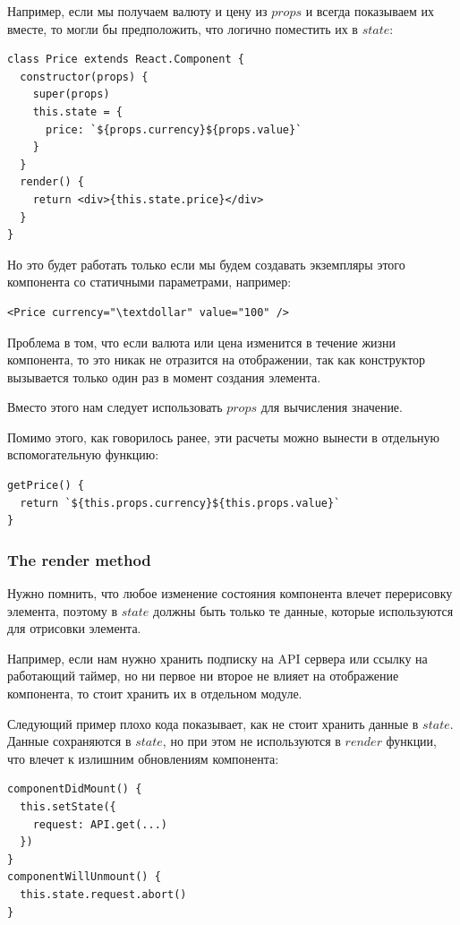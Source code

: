 Например, если мы получаем валюту и цену из $props$ и всегда показываем их вместе, то могли бы предположить, что логично поместить их в $state$:

\begin{lstlisting}
class Price extends React.Component {
  constructor(props) {
    super(props)
    this.state = {
      price: `${props.currency}${props.value}`
    } 
  }
  render() {
    return <div>{this.state.price}</div>
  }
}
\end{lstlisting}

Но это будет работать только если мы будем создавать экземпляры этого компонента со статичными параметрами, например:

\begin{lstlisting}
<Price currency="\textdollar" value="100" /> 
\end{lstlisting}

Проблема в том, что если валюта или цена изменится в течение жизни компонента, то это никак не отразится на отображении, так как конструктор вызывается только один раз в момент создания элемента.

Вместо этого нам следует использовать $props$ для вычисления значение.

Помимо этого, как говорилось ранее, эти расчеты можно вынести в отдельную вспомогательную функцию:

\begin{lstlisting}
getPrice() {
  return `${this.props.currency}${this.props.value}`
}
\end{lstlisting}

\subsubsection{The render method}

Нужно помнить, что любое изменение состояния компонента влечет перерисовку элемента, поэтому в $state$ должны быть только те данные, которые используются для отрисовки элемента.

Например, если нам нужно хранить подписку на API сервера или ссылку на работающий таймер, но ни первое ни второе не влияет на отображение компонента, то стоит хранить их в отдельном модуле.

Следующий пример плохо кода показывает, как не стоит хранить данные в $state$. Данные сохраняются в $state$, но при этом не используются в $render$ функции, что влечет к излишним обновлениям компонента:

\begin{lstlisting}
componentDidMount() {
  this.setState({
    request: API.get(...)
  })
}
componentWillUnmount() {
  this.state.request.abort()
}
\end{lstlisting}

